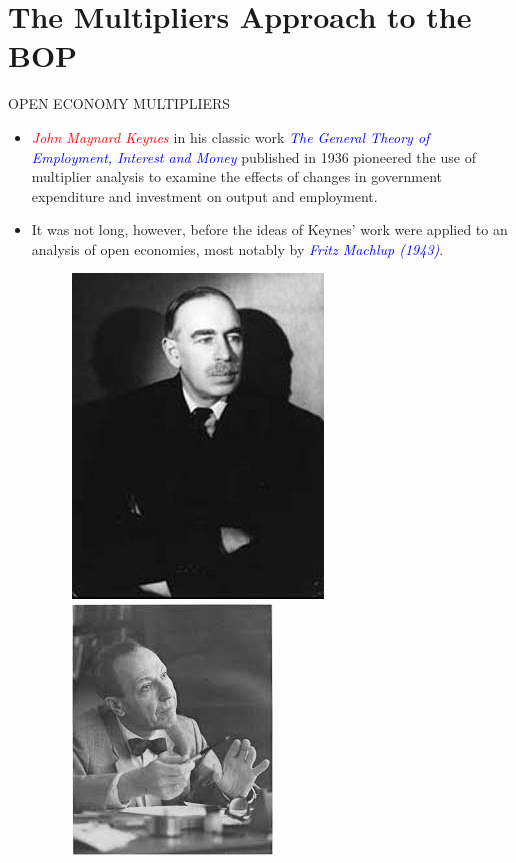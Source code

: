 \documentclass[10pt,hyperref={CJKbookmarks=true},xcolor=dvipsnames,aspectratio=169]{beamer}
\begin{document}
\section{The Multipliers Approach to the BOP}
\begin{frame}{OPEN ECONOMY MULTIPLIERS}

\begin{itemize}
	\item \textit{\textcolor{red}{John Maynard Keynes }}in his classic work
	\textit{\textcolor{blue}{The General Theory of Employment, Interest
			and Money}} published in 1936 pioneered the use of multiplier analysis
	to examine the effects of changes in government expenditure and investment
	on output and employment.
	\item It was not long, however, before the ideas of Keynes’ work were applied
	to an analysis of open economies, most notably by \textit{\textcolor{blue}{Fritz
			Machlup (1943)}}.
	\begin{figure}
		
		
		\includegraphics[scale=0.3]{fig/boptheory/lec08-9.JPG}\includegraphics[scale=0.4]{fig/boptheory/lec08-8.JPG}
		
	\end{figure}
	
\end{itemize}
\end{frame}
\end{document}
